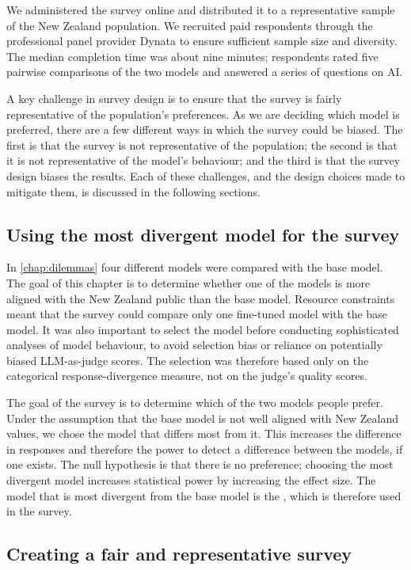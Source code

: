 We administered the survey online and distributed it to a representative sample of the New Zealand population. We recruited paid respondents through the professional panel provider Dynata to ensure sufficient sample size and diversity. The median completion time was about nine minutes; respondents rated five pairwise comparisons of the two models and answered a series of questions on AI.

A key challenge in survey design is to ensure that the survey is fairly representative of the population's preferences. As we are deciding which model is preferred, there are a few different ways in which the survey could be biased. The first is that the survey is not representative of the population; the second is that it is not representative of the model's behaviour; and the third is that the survey design biases the results. Each of these challenges, and the design choices made to mitigate them, is discussed in the following sections.

\subsection{Using the most divergent model for the survey}

In \ref{chap:dilemmas} four different models were compared with the base model. The goal of this chapter is to determine whether one of the models is more aligned with the New Zealand public than the base model. Resource constraints meant that the survey could compare only one fine-tuned model with the base model. It was also important to select the model before conducting sophisticated analyses of model behaviour, to avoid selection bias or reliance on potentially biased LLM-as-judge scores. The selection was therefore based only on the categorical response-divergence measure, not on the judge's quality scores.

The goal of the survey is to determine which of the two models people prefer. Under the assumption that the base model is not well aligned with New Zealand values, we chose the model that differs most from it. This increases the difference in responses and therefore the power to detect a difference between the models, if one exists. The null hypothesis is that there is no preference; choosing the most divergent model increases statistical power by increasing the effect size. The model that is most divergent from the base model is the , which is therefore used in the survey.

\subsection{Creating a fair and representative survey}

